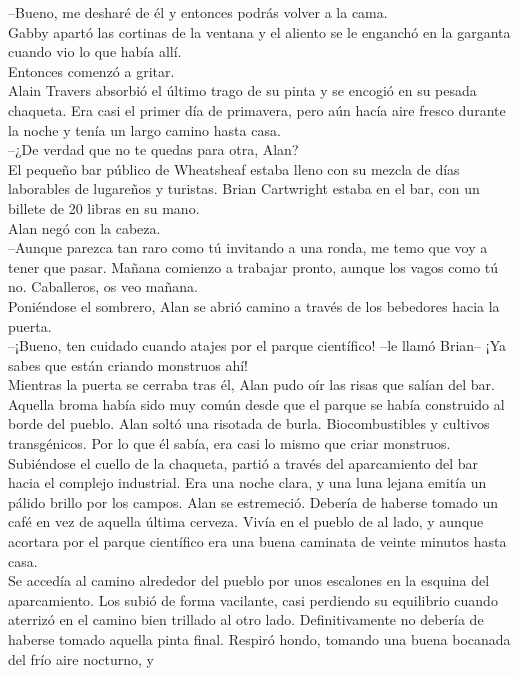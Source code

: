 {--Bueno, me desharé de él y entonces podrás volver a la cama.\\
Gabby apartó las cortinas de la ventana y el aliento se le enganchó en
la garganta cuando vio lo que había allí.\\
Entonces comenzó a gritar.\\
Alain Travers absorbió el último trago de su pinta y se encogió en su
pesada chaqueta. Era casi el primer día de primavera, pero aún hacía
aire fresco durante la noche y tenía un largo camino hasta casa.\\
--¿De verdad que no te quedas para otra, Alan?\\
El pequeño bar público de Wheatsheaf estaba lleno con su mezcla de días
laborables de lugareños y turistas. Brian Cartwright estaba en el bar,
con un billete de 20 libras en su mano.\\
Alan negó con la cabeza.\\
--Aunque parezca tan raro como tú invitando a una ronda, me temo que voy
a tener que pasar. Mañana comienzo a trabajar pronto, aunque los vagos
como tú no. Caballeros, os veo mañana.\\
Poniéndose el sombrero, Alan se abrió camino a través de los bebedores
hacia la puerta.\\
--¡Bueno, ten cuidado cuando atajes por el parque científico! --le llamó
Brian-- ¡Ya sabes que están criando monstruos ahí!\\
Mientras la puerta se cerraba tras él, Alan pudo oír las risas que
salían del bar. Aquella broma había sido muy común desde que el parque
se había construido al borde del pueblo. Alan soltó una risotada de
burla. Biocombustibles y cultivos transgénicos. Por lo que él sabía, era
casi lo mismo que criar monstruos.\\
Subiéndose el cuello de la chaqueta, partió a través del aparcamiento
del bar hacia el complejo industrial. Era una noche clara, y una luna
lejana emitía un pálido brillo por los campos. Alan se estremeció.
Debería de haberse tomado un café en vez de aquella última cerveza.
Vivía en el pueblo de al lado, y aunque acortara por el parque
científico era una buena caminata de veinte minutos hasta casa.\\
Se accedía al camino alrededor del pueblo por unos escalones en la
esquina del aparcamiento. Los subió de forma vacilante, casi perdiendo
su equilibrio cuando aterrizó en el camino bien trillado al otro lado.
Definitivamente no debería de haberse tomado aquella pinta final.
Respiró hondo, tomando una buena bocanada del frío aire nocturno, y
}
